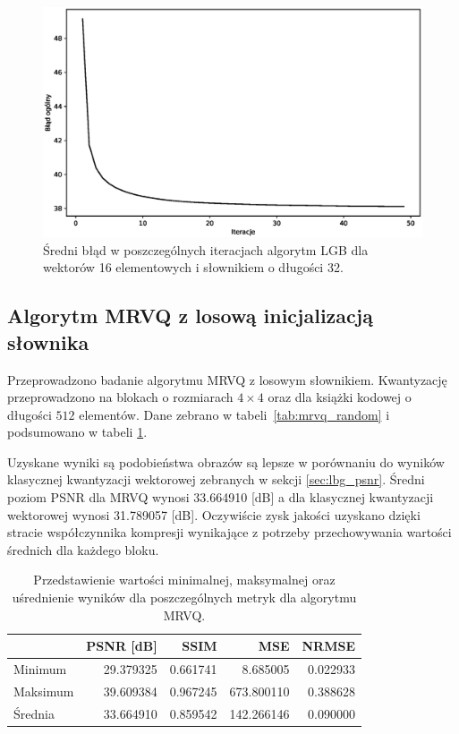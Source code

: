 \documentclass{article}
\begin{document}
\begin{figure}[H]
  \centering
  \includegraphics[width=.9\linewidth]{images/lbg_4x4_32_mean_iterations.eps}
  \caption{Średni błąd w poszczególnych iteracjach algorytm LGB dla wektorów 16 elementowych i słownikiem o długości 32.}
  \label{fig:lbg_iterations_mean}
\end{figure}

\subsection{Algorytm MRVQ z losową inicjalizacją słownika}

Przeprowadzono badanie algorytmu MRVQ z losowym słownikiem. Kwantyzację przeprowadzono na blokach o rozmiarach $4 \times 4$ oraz dla książki
kodowej o długości $512$ elementów. Dane zebrano w \mbox{tabeli \ref{tab:mrvq_random}} i podsumowano w tabeli \mbox{\ref{tab:mrvq_summary}}.

Uzyskane wyniki są podobieństwa obrazów są lepsze w porównaniu do wyników klasycznej kwantyzacji wektorowej zebranych w sekcji \ref{sec:lbg_psnr}. Średni poziom PSNR dla MRVQ wynosi 33.664910 [dB] a dla klasycznej kwantyzacji wektorowej wynosi 31.789057 [dB]. Oczywiście zysk jakości uzyskano dzięki stracie współczynnika kompresji wynikające z potrzeby przechowywania wartości średnich dla każdego bloku.

\begin{table}[h]
  \caption{Przedstawienie wartości minimalnej, maksymalnej oraz uśrednienie wyników dla poszczególnych metryk dla algorytmu MRVQ.}
  \label{tab:mrvq_summary}
  \centering
  \begin{tabular}{@{}lrrrr@{}}
    \toprule
             & PSNR {[}dB{]} & SSIM     & MSE        & NRMSE    \\ \midrule
    Minimum  & 29.379325     & 0.661741 & 8.685005   & 0.022933 \\
    Maksimum & 39.609384     & 0.967245 & 673.800110 & 0.388628 \\
    Średnia  & 33.664910     & 0.859542 & 142.266146 & 0.090000 \\
    \bottomrule
  \end{tabular}
\end{table}
\end{document}
